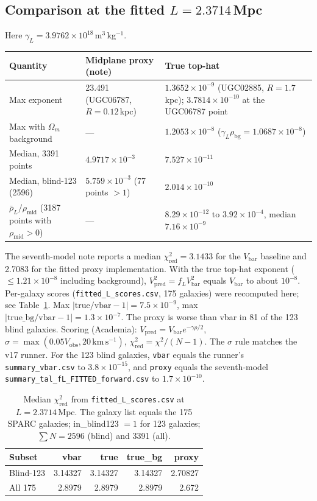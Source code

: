\documentclass[10pt,a4paper]{article}
\begin{document}
\subsection{\texorpdfstring{Comparison at the fitted $L=2.3714$\,Mpc}{Comparison at the fitted L = 2.3714 Mpc}}
Here $\gamma_L=3.9762\times10^{18}$\,m$^3$\,kg$^{-1}$.
\begin{center}\small
\begin{tabularx}{\textwidth}{@{}lLL@{}}
\toprule
Quantity & Midplane proxy (note) & True top-hat\\
\midrule
Max exponent & 23.491 (UGC06787, $R=0.12$\,kpc) & $1.3652\times10^{-9}$ (UGC02885, $R=1.7$\,kpc); $3.7814\times10^{-10}$ at the UGC06787 point\\
Max with $\Omega_m$ background & --- & $1.2053\times10^{-8}$ ($\gamma_L\rho_\mathrm{bg}=1.0687\times10^{-8}$)\\
Median, 3391 points & $4.9717\times10^{-3}$ & $7.527\times10^{-11}$\\
Median, blind-123 (2596) & $5.759\times10^{-3}$ (77 points $>1$) & $2.014\times10^{-10}$\\
$\bar\rho_L/\rho_\mathrm{mid}$ (3187 points with $\rho_\mathrm{mid}>0$) & --- & $8.29\times10^{-12}$ to $3.92\times10^{-4}$, median $7.16\times10^{-9}$\\
\bottomrule
\end{tabularx}
\end{center}
The seventh-model note reports a median $\chi^2_\mathrm{red}=3.1433$ for the $V_\mathrm{bar}$ baseline and 2.7083 for the fitted proxy implementation. With the true top-hat exponent ($\le1.21\times10^{-8}$ including background), $V_\mathrm{pred}^2=f_LV_\mathrm{bar}^2$ equals $V_\mathrm{bar}$ to about $10^{-8}$. Per-galaxy scores (\texttt{fitted\_L\_scores.csv}, 175 galaxies) were recomputed here; see Table~\ref{tab:fl}. Max $|\mathrm{true}/\mathrm{vbar}-1|=7.5\times10^{-9}$, max $|\mathrm{true\_bg}/\mathrm{vbar}-1|=1.3\times10^{-7}$. The proxy is worse than vbar in 81 of the 123 blind galaxies. Scoring (Academia): $V_\mathrm{pred}=V_\mathrm{bar}e^{-\gamma\rho/2}$, $\sigma=\max(0.05V_\mathrm{obs},20\,\mathrm{km\,s^{-1}})$, $\chi^2_\mathrm{red}=\chi^2/(N-1)$. The $\sigma$ rule matches the v17 runner. For the 123 blind galaxies, \texttt{vbar} equals the runner's \texttt{summary\_vbar.csv} to $3.8\times10^{-15}$, and \texttt{proxy} equals the seventh-model \texttt{summary\_tal\_fL\_FITTED\_forward.csv} to $1.7\times10^{-10}$. \begin{table}[!htbp]\centering\small
\caption{Median $\chi^2_\mathrm{red}$ from \texttt{fitted\_L\_scores.csv} at $L=2.3714$\,Mpc. The galaxy list equals the 175 SPARC galaxies; in\_blind123 $=1$ for 123 galaxies; $\sum N=2596$ (blind) and 3391 (all).}\label{tab:fl}
\begin{tabular}{@{}lrrrr@{}}\toprule
Subset & vbar & true & true\_bg & proxy\\\midrule
Blind-123 & 3.14327 & 3.14327 & 3.14327 & 2.70827\\
All 175 & 2.8979 & 2.8979 & 2.8979 & 2.672\\\bottomrule
\end{tabular}\end{table}
\end{document}
